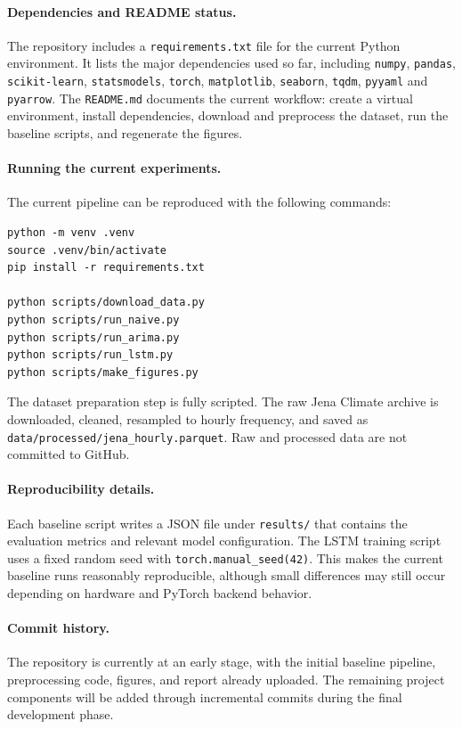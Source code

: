 \documentclass[11pt,a4paper]{article}
\begin{document}
\paragraph{Dependencies and README status.}
The repository includes a \texttt{requirements.txt} file for the current
Python environment. It lists the major dependencies used so far,
including \texttt{numpy}, \texttt{pandas}, \texttt{scikit-learn},
\texttt{statsmodels}, \texttt{torch}, \texttt{matplotlib},
\texttt{seaborn}, \texttt{tqdm}, \texttt{pyyaml} and \texttt{pyarrow}. The
\texttt{README.md} documents the current workflow: create a virtual
environment, install dependencies, download and preprocess the dataset,
run the baseline scripts, and regenerate the figures.

\paragraph{Running the current experiments.}
The current pipeline can be reproduced with the following commands:
\begin{verbatim}
python -m venv .venv
source .venv/bin/activate
pip install -r requirements.txt

python scripts/download_data.py
python scripts/run_naive.py
python scripts/run_arima.py
python scripts/run_lstm.py
python scripts/make_figures.py
\end{verbatim}
The dataset preparation step is fully scripted. The raw Jena Climate
archive is downloaded, cleaned, resampled to hourly frequency, and saved
as \texttt{data/processed/jena\_hourly.parquet}. Raw and processed data
are not committed to GitHub.

\paragraph{Reproducibility details.}
Each baseline script writes a JSON file under \texttt{results/} that
contains the evaluation metrics and relevant model configuration. The
LSTM training script uses a fixed random seed with
\texttt{torch.manual\_seed(42)}. This makes the current baseline runs
reasonably reproducible, although small differences may still occur
depending on hardware and PyTorch backend behavior.

\paragraph{Commit history.}
The repository is currently at an early stage, with the initial
baseline pipeline, preprocessing code, figures, and report already
uploaded. The remaining project components will be added through
incremental commits during the final development phase.
\end{document}
